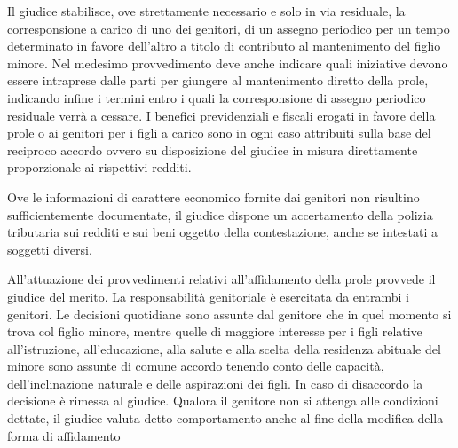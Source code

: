 \documentclass[twocolumn,12pt]{article}
\begin{document}
Il giudice stabilisce, ove strettamente necessario e solo in via residuale, la corresponsione a carico di uno dei genitori, di un
assegno periodico per un tempo determinato in favore dell’altro a titolo di contributo al mantenimento del figlio minore. Nel medesimo provvedimento deve anche indicare quali iniziative devono essere intraprese dalle parti per giungere al mantenimento diretto della prole, indicando infine i termini entro i quali la corresponsione di assegno periodico residuale verrà a cessare. I benefici previdenziali e fiscali erogati in favore della prole o ai genitori per i figli a carico sono in ogni caso attribuiti sulla base del reciproco accordo ovvero su disposizione del giudice in misura direttamente proporzionale ai rispettivi redditi.

Ove le informazioni di carattere economico fornite dai genitori non risultino sufficientemente documentate, il giudice dispone un accertamento della polizia tributaria sui redditi e sui beni oggetto della contestazione, anche se intestati a soggetti diversi.

All’attuazione dei provvedimenti relativi all’affidamento della prole provvede il giudice del merito. La responsabilità genitoriale
è esercitata da entrambi i genitori. Le decisioni quotidiane sono assunte dal genitore che in quel momento si trova col figlio minore, mentre quelle di maggiore interesse per i figli relative all’istruzione, all’educazione, alla salute e alla scelta della residenza
abituale del minore sono assunte di comune accordo tenendo conto delle capacità, dell’inclinazione naturale e delle aspirazioni dei
figli. In caso di disaccordo la decisione è rimessa al giudice. Qualora il genitore non si attenga alle condizioni dettate, il giudice valuta detto comportamento anche al fine della modifica della forma di affidamento
\guillemotright

\bigbreak
{}
\end{document}
